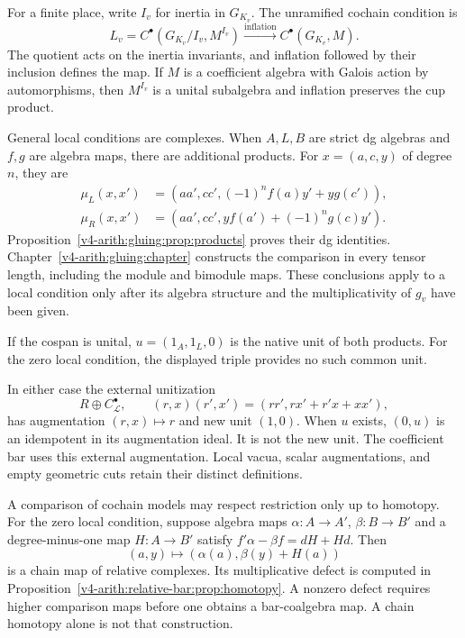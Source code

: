 For a finite place, write \(I_v\) for inertia in \(G_{K_v}\).
The unramified cochain condition is
\begin{equation}\label{v4-arith:coefficients:eq:unramified}
 L_v=C^\bullet(G_{K_v}/I_v,M^{I_v})
 \xrightarrow{\mathrm{inflation}} C^\bullet(G_{K_v},M).
\end{equation}
The quotient acts on the inertia invariants, and inflation followed
by their inclusion defines the map. If \(M\) is a coefficient algebra
with Galois action by automorphisms, then \(M^{I_v}\) is a unital
subalgebra and inflation preserves the cup product.

General local conditions are complexes. When \(A,L,B\) are strict
dg algebras and \(f,g\) are algebra maps, there are additional products.
For \(x=(a,c,y)\) of degree \(n\), they are
\begin{align}
 \mu_L(x,x')&=(aa',cc',(-1)^nf(a)y'+yg(c')),
 \label{v4-arith:coefficients:eq:left-product}\\
 \mu_R(x,x')&=(aa',cc',yf(a')+(-1)^ng(c)y').
 \label{v4-arith:coefficients:eq:right-product}
\end{align}
Proposition~\ref{v4-arith:gluing:prop:products} proves their dg
identities. Chapter~\ref{v4-arith:gluing:chapter} constructs the
comparison in every tensor length, including the module and bimodule
maps. These conclusions apply to a local condition only after its
algebra structure and the multiplicativity of \(g_v\) have been given.

If the cospan is unital, \(u=(1_A,1_L,0)\) is the native unit of
both products. For the zero local condition, the displayed triple
provides no such common unit.

In either case the external unitization
\[
 R\oplus C^\bullet_{\mathcal L},\qquad
 (r,x)(r',x')=(rr',rx'+r'x+xx'),
\]
has augmentation \((r,x)\mapsto r\) and new unit \((1,0)\).
When \(u\) exists, \((0,u)\) is an idempotent in its augmentation
ideal. It is not the new unit. The coefficient bar uses this external
augmentation. Local vacua, scalar augmentations, and empty geometric
cuts retain their distinct definitions.

A comparison of cochain models may respect restriction only up to
homotopy. For the zero local condition, suppose algebra maps
\(\alpha:A\to A'\), \(\beta:B\to B'\) and a degree-minus-one map
\(H:A\to B'\) satisfy
\(f'\alpha-\beta f=dH+Hd\). Then
\[
 (a,y)\longmapsto(\alpha(a),\beta(y)+H(a))
\]
is a chain map of relative complexes. Its multiplicative defect is
computed in Proposition~\ref{v4-arith:relative-bar:prop:homotopy}.
A nonzero defect requires higher comparison maps before one obtains
a bar-coalgebra map. A chain homotopy alone is not that construction.

